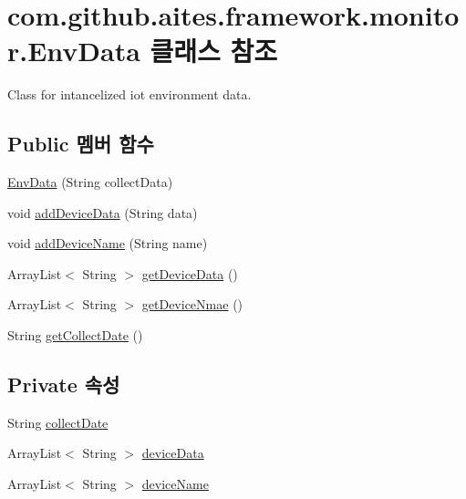 \hypertarget{classcom_1_1github_1_1aites_1_1framework_1_1monitor_1_1_env_data}{}\section{com.\+github.\+aites.\+framework.\+monitor.\+Env\+Data 클래스 참조}
\label{classcom_1_1github_1_1aites_1_1framework_1_1monitor_1_1_env_data}


Class for intancelized iot environment data.  


\subsection*{Public 멤버 함수}
\begin{DoxyCompactItemize}
\item 
\mbox{\hyperlink{classcom_1_1github_1_1aites_1_1framework_1_1monitor_1_1_env_data_a4b91c47d9954a2691df3efb3cce7970b}{Env\+Data}} (String collect\+Data)
\item 
void \mbox{\hyperlink{classcom_1_1github_1_1aites_1_1framework_1_1monitor_1_1_env_data_abac3c74684213308551467918f552f94}{add\+Device\+Data}} (String data)
\item 
void \mbox{\hyperlink{classcom_1_1github_1_1aites_1_1framework_1_1monitor_1_1_env_data_abcd38a14587816954fa5c200f12d75b7}{add\+Device\+Name}} (String name)
\item 
Array\+List$<$ String $>$ \mbox{\hyperlink{classcom_1_1github_1_1aites_1_1framework_1_1monitor_1_1_env_data_a4046763707974cd911f699f413469831}{get\+Device\+Data}} ()
\item 
Array\+List$<$ String $>$ \mbox{\hyperlink{classcom_1_1github_1_1aites_1_1framework_1_1monitor_1_1_env_data_aae2dc69f2800801a041a93f0e4fe1bdd}{get\+Device\+Nmae}} ()
\item 
String \mbox{\hyperlink{classcom_1_1github_1_1aites_1_1framework_1_1monitor_1_1_env_data_a1bcf9a801b4d614fdf567ec20121638c}{get\+Collect\+Date}} ()
\end{DoxyCompactItemize}
\subsection*{Private 속성}
\begin{DoxyCompactItemize}
\item 
String \mbox{\hyperlink{classcom_1_1github_1_1aites_1_1framework_1_1monitor_1_1_env_data_aa8a06c5bb87ce218bd214343bf78f45e}{collect\+Date}}
\item 
Array\+List$<$ String $>$ \mbox{\hyperlink{classcom_1_1github_1_1aites_1_1framework_1_1monitor_1_1_env_data_a489a7cb189ca3b1fcc150ec2ef162552}{device\+Data}}
\item 
Array\+List$<$ String $>$ \mbox{\hyperlink{classcom_1_1github_1_1aites_1_1framework_1_1monitor_1_1_env_data_acee6d64d485b093c7fce1d7a67095457}{device\+Name}}
\end{DoxyCompactItemize}


